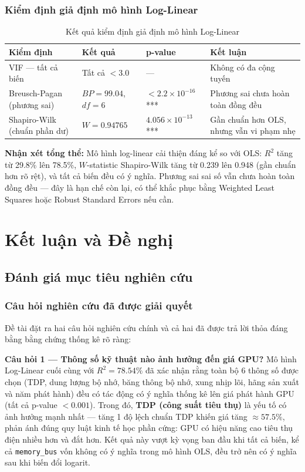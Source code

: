 \documentclass[a4paper]{article}
\begin{document}
\subsubsection{Kiểm định giả định mô hình Log-Linear}

\begin{table}[h!]
\centering
\caption{Kết quả kiểm định giả định mô hình Log-Linear}
\begin{tabular}{|p{4.5cm}|p{4cm}|l|p{4cm}|}
\hline
\textbf{Kiểm định} & \textbf{Kết quả} & \textbf{p-value} & \textbf{Kết luận} \\
\hline
VIF --- tất cả biến & Tất cả $< 3.0$ & --- & Không có đa cộng tuyến \\
Breusch-Pagan (phương sai) & $BP = 99.04$, $df = 6$ & $< 2.2 \times 10^{-16}$ *** & Phương sai chưa hoàn toàn đồng đều \\
Shapiro-Wilk (chuẩn phần dư) & $W = 0.94765$ & $4.056 \times 10^{-13}$ *** & Gần chuẩn hơn OLS, nhưng vẫn vi phạm nhẹ \\
\hline
\end{tabular}
\end{table}

\textbf{Nhận xét tổng thể:} Mô hình log-linear cải thiện đáng kể so với OLS: $R^2$ tăng từ 29.8\% lên 78.5\%, $W$-statistic Shapiro-Wilk tăng từ 0.239 lên 0.948 (gần chuẩn hơn rõ rệt), và tất cả biến đều có ý nghĩa. Phương sai sai số vẫn chưa hoàn toàn đồng đều --- đây là hạn chế còn lại, có thể khắc phục bằng Weighted Least Squares hoặc Robust Standard Errors nếu cần.

\section{Kết luận và Đề nghị}

\subsection{Đánh giá mục tiêu nghiên cứu}

\subsubsection{Câu hỏi nghiên cứu đã được giải quyết}

Đề tài đặt ra hai câu hỏi nghiên cứu chính và cả hai đã được trả lời thỏa đáng bằng bằng chứng thống kê rõ ràng:

\textbf{Câu hỏi 1 --- Thông số kỹ thuật nào ảnh hưởng đến giá GPU?} Mô hình Log-Linear cuối cùng với $R^2 = 78.54\%$ đã xác nhận rằng toàn bộ 6 thông số được chọn (TDP, dung lượng bộ nhớ, băng thông bộ nhớ, xung nhịp lõi, hãng sản xuất và năm phát hành) đều có tác động có ý nghĩa thống kê lên giá phát hành GPU (tất cả p-value $< 0.001$). Trong đó, \textbf{TDP (công suất tiêu thụ)} là yếu tố có ảnh hưởng mạnh nhất --- tăng 1 độ lệch chuẩn TDP khiến giá tăng $\approx 57.5\%$, phản ánh đúng quy luật kinh tế học phần cứng: GPU có hiệu năng cao tiêu thụ điện nhiều hơn và đắt hơn. Kết quả này vượt kỳ vọng ban đầu khi tất cả biến, kể cả \texttt{memory\_bus} vốn không có ý nghĩa trong mô hình OLS, đều trở nên có ý nghĩa sau khi biến đổi logarit.
\end{document}
